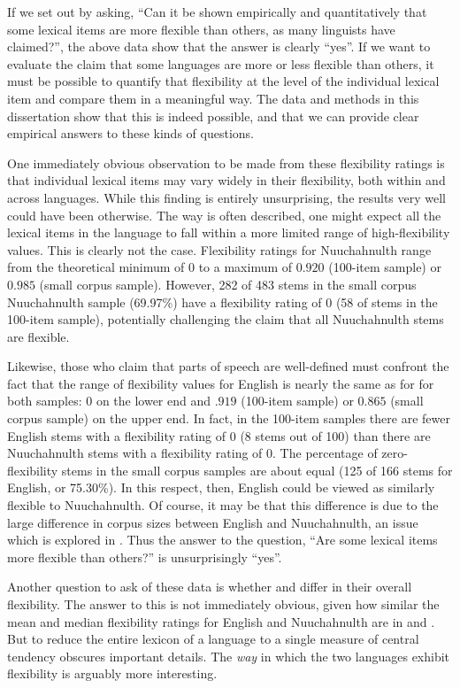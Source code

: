 If we set out by asking, \enquote{Can it be shown empirically and quantitatively that some lexical items are more flexible than others, as many linguists have claimed?}, the above data show that the answer is clearly \enquote{yes}. If we want to evaluate the claim that some languages are more or less flexible than others, it must be possible to quantify that flexibility at the level of the individual lexical item and compare them in a meaningful way. The data and methods in this dissertation show that this is indeed possible, and that we can provide clear empirical answers to these kinds of questions.

One immediately obvious observation to be made from these flexibility ratings is that individual lexical items may vary widely in their flexibility, both within and across languages. While this finding is entirely unsurprising, the results very well could have been otherwise. The way  is often described, one might expect all the lexical items in the language to fall within a more limited range of high-flexibility values. This is clearly not the case. Flexibility ratings for Nuuchahnulth range from the theoretical minimum of $0$ to a maximum of $0.920$ (100-item sample) or $0.985$ (small corpus sample). However, 282 of 483 stems in the small corpus Nuuchahnulth sample (69.97\%) have a flexibility rating of $0$ (58 of stems in the 100-item sample), potentially challenging the claim that all Nuuchahnulth stems are flexible.

Likewise, those who claim that  parts of speech are well-defined must confront the fact that the range of flexibility values for English is nearly the same as for  for both samples: $0$ on the lower end and $.919$ (100-item sample) or $0.865$ (small corpus sample) on the upper end. In fact, in the 100-item samples there are fewer English stems with a flexibility rating of $0$ (8 stems out of 100) than there are Nuuchahnulth stems with a flexibility rating of $0$. The percentage of zero-flexibility stems in the small corpus samples are about equal (125 of 166 stems for English, or 75.30\%). In this respect, then, English could be viewed as similarly flexible to Nuuchahnulth. Of course, it may be that this difference is due to the large difference in corpus sizes between English and Nuuchahnulth, an issue which is explored in . Thus the answer to the question, \enquote{Are some lexical items more flexible than others?} is unsurprisingly \enquote{yes}.

Another question to ask of these data is whether  and  differ in their overall flexibility. The answer to this is not immediately obvious, given how similar the mean and median flexibility ratings for English and Nuuchahnulth are in  and . But to reduce the entire lexicon of a language to a single measure of central tendency obscures important details. The \emph{way} in which the two languages exhibit flexibility is arguably more interesting.

